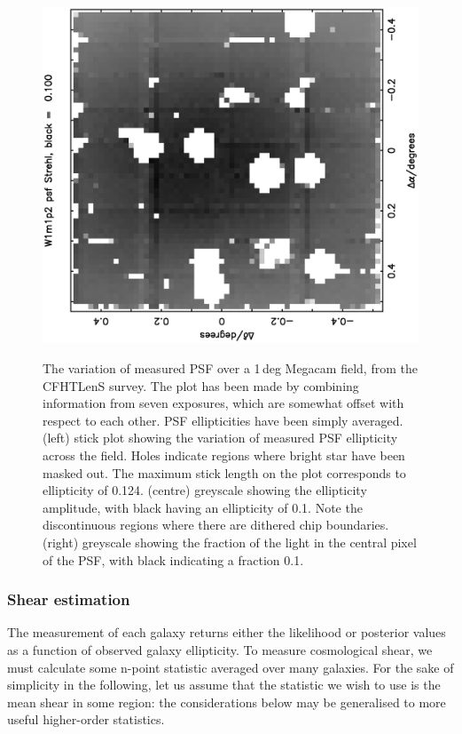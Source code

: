 \documentclass{article}
\begin{document}
\begin{figure}
{{\includegraphics{w1m1p2_strehl.ps}
}}
\caption{The variation of measured PSF over a 1\,deg Megacam field, from the CFHTLenS survey.  
The plot has been made by combining information from seven exposures, which are somewhat
offset with respect to each other.  PSF ellipticities have been simply averaged.
(left) stick plot showing the variation of measured PSF ellipticity across the field.  Holes indicate
regions where bright star have been masked out. The maximum stick length on the plot corresponds
to ellipticity of 0.124.
(centre) greyscale showing the ellipticity amplitude, with black having an ellipticity of 0.1. Note
the discontinuous regions where there are dithered chip boundaries.
(right) greyscale showing the fraction of the light in the central pixel of the PSF, with black
indicating a fraction 0.1.}
\label{fig:psf}
\end{figure}

\subsubsection{Shear estimation}
The measurement of each galaxy returns either the likelihood or posterior values as a function of observed
galaxy ellipticity.  To measure cosmological shear, we must calculate some n-point statistic averaged over
many galaxies.  For the sake of simplicity in the following, let us assume that the statistic we wish to use
is the mean shear in some region: the considerations below may be generalised to more useful higher-order
statistics.  
\end{document}
